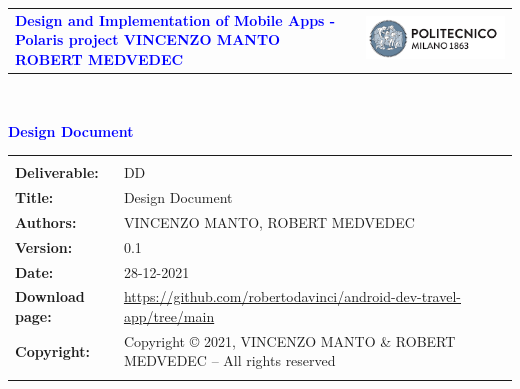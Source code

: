 




\begin{titlepage}



{\begin{table}[t!]
\centering
\begin{tabu} to \textwidth { X[1.3,r,p] X[1.7,l,p] }
\textcolor{Blue}
{\textbf{\small{Design and Implementation of Mobile Apps  - Polaris project VINCENZO MANTO ROBERT MEDVEDEC}}} & \includegraphics[scale=0.5]{Images/PolimiLogo}
\end{tabu}
\end{table}}~\\ [7cm]


\begin{flushleft}

{\textcolor{Blue}{\textbf{\Huge{Design Document}}}} \\ [1cm]

\end{flushleft}

\end{titlepage}

\begin{table}[h!]
\begin{tabu} to \textwidth { X[0.3,r,p] X[0.7,l,p] }
\hline
\\
\textbf{Deliverable:} & DD\\
\textbf{Title:} & Design Document \\
\textbf{Authors:} & VINCENZO MANTO, ROBERT MEDVEDEC \\
\textbf{Version:} & 0.1 \\ 
\textbf{Date:} & 28-12-2021 \\
\textbf{Download page:} & \url{https://github.com/robertodavinci/android-dev-travel-app/tree/main} \\
\textbf{Copyright:} & Copyright © 2021, VINCENZO MANTO \& ROBERT MEDVEDEC – All rights reserved \\
\\
\hline
\end{tabu}
\end{table}




